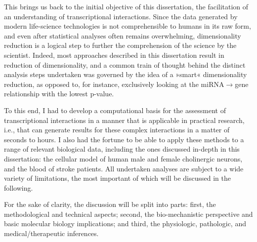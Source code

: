 This brings us back to the initial objective of this dissertation, the facilitation of an understanding of transcriptional interactions. Since the data generated by modern life-science technologies is not comprehensible to humans in its raw form, and even after statistical analyses often remains overwhelming, dimensionality reduction is a logical step to further the comprehension of the science by the scientist. Indeed, most approaches described in this dissertation result in reduction of dimensionality, and a common train of thought behind the distinct analysis steps undertaken was governed by the idea of a »smart« dimensionality reduction, as opposed to, for instance, exclusively looking at the miRNA$\to$gene relationship with the lowest p-value.

To this end, I had to develop a computational basis for the assessment of transcriptional interactions in a manner that is applicable in practical research, i.e., that can generate results for these complex interactions in a matter of seconds to hours. I also had the fortune to be able to apply these methods to a range of relevant biological data, including the ones discussed in-depth in this dissertation: the cellular model of human male and female cholinergic neurons, and the blood of stroke patients. All undertaken analyses are subject to a wide variety of limitations, the most important of which will be discussed in the following.

For the sake of clarity, the discussion will be split into parts: first, the methodological and technical aspects; second, the bio-mechanistic perspective and basic molecular biology implications; and third, the physiologic, pathologic, and medical/therapeutic inferences.



